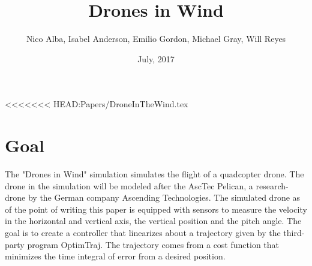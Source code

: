 \documentclass[12pt]{article}
\title{Drones in Wind}
\author{Nico Alba, Isabel Anderson, Emilio Gordon, Michael Gray, Will Reyes}
\date{July, 2017}
\begin{document}
<<<<<<< HEAD:Papers/DroneInTheWind.tex
	
	\maketitle
	
	
	\section{Goal}
	The "Drones in Wind" simulation simulates the flight of a quadcopter drone. The drone in the simulation will be modeled after the AscTec Pelican, a research-drone by the German company Ascending Technologies. The simulated drone as of the point of writing this paper is equipped with sensors to measure the velocity in the horizontal and vertical axis, the vertical position and the pitch angle. The goal is to create a controller that linearizes about a trajectory given by the third-party program OptimTraj. The trajectory comes from a cost function that minimizes the time integral of error from a desired position.
\end{document}
